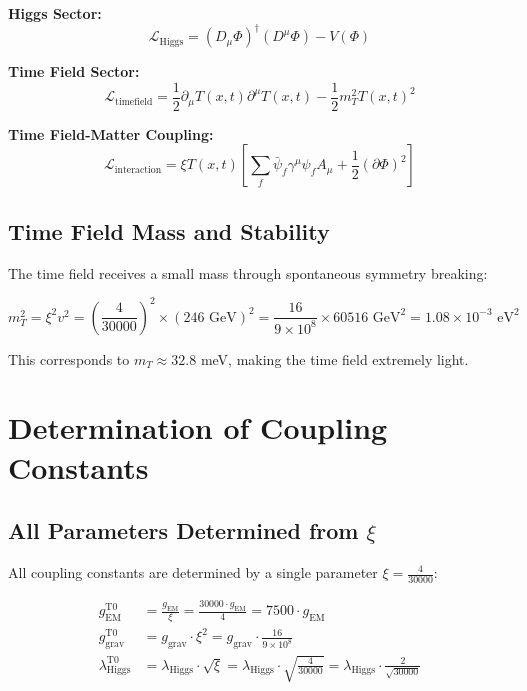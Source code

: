 \documentclass[12pt,a4paper]{report}
\newcommand{\Tfield}{T(x,t)}  %
\newcommand{\xipar}{\xi}      %
\begin{document}
	\textbf{Higgs Sector:}
	\begin{equation}
		\mathcal{L}_{\text{Higgs}} = (D_\mu \Phi)^\dagger (D^\mu \Phi) - V(\Phi)
	\end{equation}
	
	\textbf{Time Field Sector:}
	\begin{equation}
		\mathcal{L}_{\text{timefield}} = \frac{1}{2} \partial_\mu \Tfield \partial^\mu \Tfield - \frac{1}{2} m_T^2 \Tfield^2
	\end{equation}
	
	\textbf{Time Field-Matter Coupling:}
	\begin{equation}
		\mathcal{L}_{\text{interaction}} = \xipar \Tfield \left[ \sum_f \bar{\psi}_f \gamma^\mu \psi_f A_\mu + \frac{1}{2} (\partial \Phi)^2 \right]
	\end{equation}
	
	\subsection{Time Field Mass and Stability}\label{subsec:timefield_mass}
	
	The time field receives a small mass through spontaneous symmetry breaking:
	
	\begin{equation}\label{eq:timefield_mass}
		m_T^2 = \xipar^2 v^2 = \left(\frac{4}{30000}\right)^2 \times (246 \text{ GeV})^2 = \frac{16}{9 \times 10^8} \times 60516 \text{ GeV}^2 = 1.08 \times 10^{-3} \text{ eV}^2
	\end{equation}
	
	This corresponds to $m_T \approx 32.8$ meV, making the time field extremely light.
	
	\section{Determination of Coupling Constants}\label{sec:coupling_constants}
	
	\subsection{All Parameters Determined from $\xipar$}\label{subsec:parameters_from_xi}
	
	All coupling constants are determined by a single parameter $\xipar = \frac{4}{30000}$:
	
	\begin{align}
		g_{\text{EM}}^{\text{T0}} &= \frac{g_{\text{EM}}}{\xipar} = \frac{30000 \cdot g_{\text{EM}}}{4} = 7500 \cdot g_{\text{EM}} \\
		g_{\text{grav}}^{\text{T0}} &= g_{\text{grav}} \cdot \xipar^2 = g_{\text{grav}} \cdot \frac{16}{9 \times 10^8} \\
		\lambda_{\text{Higgs}}^{\text{T0}} &= \lambda_{\text{Higgs}} \cdot \sqrt{\xipar} = \lambda_{\text{Higgs}} \cdot \sqrt{\frac{4}{30000}} = \lambda_{\text{Higgs}} \cdot \frac{2}{\sqrt{30000}}
	\end{align}
	
\end{document}
